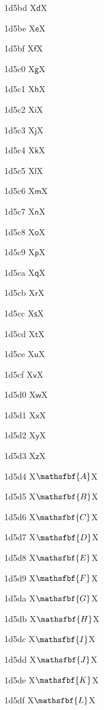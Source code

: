 \documentclass[11pt]{article}
\begin{document}
1d5bd X{\ensuremath{\mathsf{d}}}X

1d5be X{\ensuremath{\mathsf{e}}}X

1d5bf X{\ensuremath{\mathsf{f}}}X

1d5c0 X{\ensuremath{\mathsf{g}}}X

1d5c1 X{\ensuremath{\mathsf{h}}}X

1d5c2 X{\ensuremath{\mathsf{i}}}X

1d5c3 X{\ensuremath{\mathsf{j}}}X

1d5c4 X{\ensuremath{\mathsf{k}}}X

1d5c5 X{\ensuremath{\mathsf{l}}}X

1d5c6 X{\ensuremath{\mathsf{m}}}X

1d5c7 X{\ensuremath{\mathsf{n}}}X

1d5c8 X{\ensuremath{\mathsf{o}}}X

1d5c9 X{\ensuremath{\mathsf{p}}}X

1d5ca X{\ensuremath{\mathsf{q}}}X

1d5cb X{\ensuremath{\mathsf{r}}}X

1d5cc X{\ensuremath{\mathsf{s}}}X

1d5cd X{\ensuremath{\mathsf{t}}}X

1d5ce X{\ensuremath{\mathsf{u}}}X

1d5cf X{\ensuremath{\mathsf{v}}}X

1d5d0 X{\ensuremath{\mathsf{w}}}X

1d5d1 X{\ensuremath{\mathsf{x}}}X

1d5d2 X{\ensuremath{\mathsf{y}}}X

1d5d3 X{\ensuremath{\mathsf{z}}}X

1d5d4 X{\ensuremath{\mathsfbf{A}}}X

1d5d5 X{\ensuremath{\mathsfbf{B}}}X

1d5d6 X{\ensuremath{\mathsfbf{C}}}X

1d5d7 X{\ensuremath{\mathsfbf{D}}}X

1d5d8 X{\ensuremath{\mathsfbf{E}}}X

1d5d9 X{\ensuremath{\mathsfbf{F}}}X

1d5da X{\ensuremath{\mathsfbf{G}}}X

1d5db X{\ensuremath{\mathsfbf{H}}}X

1d5dc X{\ensuremath{\mathsfbf{I}}}X

1d5dd X{\ensuremath{\mathsfbf{J}}}X

1d5de X{\ensuremath{\mathsfbf{K}}}X

1d5df X{\ensuremath{\mathsfbf{L}}}X
\end{document}
